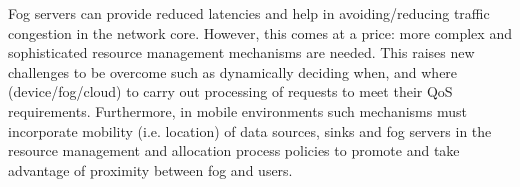 \noindent\tab Fog servers can provide reduced latencies and help in avoiding/reducing traffic congestion in the network core. However, this comes at a price: more complex and sophisticated resource management mechanisms are needed. This raises new challenges to be overcome such as dynamically deciding when, and where (device/fog/cloud) to carry out processing of requests to meet their QoS requirements. Furthermore, in mobile environments such mechanisms must incorporate mobility (i.e. location) of data sources, sinks and fog servers in the resource management and allocation process policies to promote and take advantage of proximity between fog and users.
